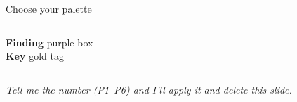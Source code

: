 \begin{frame}{Choose your palette}
\begin{columns}[T,onlytextwidth]
\begin{tcolorbox}[colback={rgb,255:red,232;green,226;blue,252},colframe={rgb,255:red,74;green,45;blue,130},
  boxrule=1pt,arc=4pt,left=3pt,right=3pt,top=2pt,bottom=2pt,fontupper=\tiny]
\textcolor[HTML]{4A2D82}{\textbf{Finding}} purple box\\
\textcolor[HTML]{C98A00}{\textbf{Key}} gold tag
\end{tcolorbox}

\end{columns}

\vspace{0.18cm}
{\centering\footnotesize\color{muted}\textit{Tell me the number (P1–P6) and I'll apply it and delete this slide.}\par}
\end{frame}
